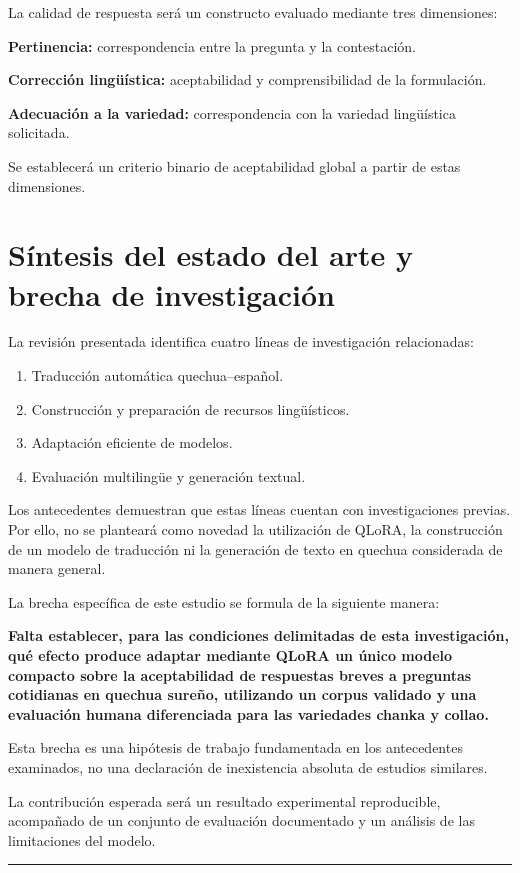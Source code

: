 La calidad de respuesta será un constructo evaluado mediante tres dimensiones:

\textbf{Pertinencia:} correspondencia entre la pregunta y la contestación.

\textbf{Corrección lingüística:} aceptabilidad y comprensibilidad de la formulación.

\textbf{Adecuación a la variedad:} correspondencia con la variedad lingüística solicitada.

Se establecerá un criterio binario de aceptabilidad global a partir de estas dimensiones.

\section{Síntesis del estado del arte y brecha de investigación}\label{suxedntesis-del-estado-del-arte-y-brecha-de-investigaciuxf3n}

La revisión presentada identifica cuatro líneas de investigación relacionadas:

\begin{enumerate}
\def\labelenumi{\arabic{enumi}.}
\tightlist
\item
  Traducción automática quechua--español.
\item
  Construcción y preparación de recursos lingüísticos.
\item
  Adaptación eficiente de modelos.
\item
  Evaluación multilingüe y generación textual.
\end{enumerate}

Los antecedentes demuestran que estas líneas cuentan con investigaciones previas. Por ello, no se planteará como novedad la utilización de QLoRA, la construcción de un modelo de traducción ni la generación de texto en quechua considerada de manera general.

La brecha específica de este estudio se formula de la siguiente manera:

\textbf{Falta establecer, para las condiciones delimitadas de esta investigación, qué efecto produce adaptar mediante QLoRA un único modelo compacto sobre la aceptabilidad de respuestas breves a preguntas cotidianas en quechua sureño, utilizando un corpus validado y una evaluación humana diferenciada para las variedades chanka y collao.}

Esta brecha es una hipótesis de trabajo fundamentada en los antecedentes examinados, no una declaración de inexistencia absoluta de estudios similares.

La contribución esperada será un resultado experimental reproducible, acompañado de un conjunto de evaluación documentado y un análisis de las limitaciones del modelo.

\begin{center}\rule{0.5\linewidth}{0.5pt}\end{center}
